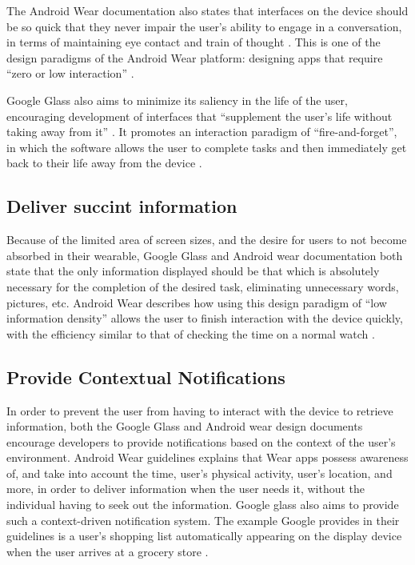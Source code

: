 \documentclass[12pt]{article}
\begin{document}
The Android Wear documentation also states that interfaces on the device should be so quick that they never impair the user's ability to engage in a conversation, in terms of maintaining eye contact and train of thought \cite{andr}. This is one of the design paradigms of the Android Wear platform: designing apps that require ``zero or low interaction'' \cite{andr2}.

Google Glass also aims to minimize its saliency in the life of the user, encouraging development of interfaces that ``supplement the user's life without taking away from it'' \cite{goog}. It promotes an interaction paradigm of ``fire-and-forget'', in which the software allows the user to complete tasks and then immediately get back to their life away from the device \cite{goog}.

\subsection{Deliver succint information}
Because of the limited area of screen sizes, and the desire for users to not become absorbed in their wearable, Google Glass and Android wear documentation both state that the only information displayed should be that which is absolutely necessary for the completion of the desired task, eliminating unnecessary words, pictures, etc. Android Wear describes how using this design paradigm of ``low information density'' allows the user to finish interaction with the device quickly, with the efficiency similar to that of checking the time on a normal watch \cite{andr3}. 

\subsection{Provide Contextual Notifications}
In order to prevent the user from having to interact with the device to retrieve information, both the Google Glass and Android wear design documents encourage developers to provide notifications based on the context of the user's environment. Android Wear guidelines explains that Wear apps possess awareness of, and take into account the time, user's physical activity, user's location, and more, in order to deliver information when the user needs it, without the individual having to seek out the information\cite{andr2}. Google glass also aims to provide such a context-driven notification system. The example Google provides in their guidelines is a user's shopping list automatically appearing on the display device when the user arrives at a grocery store \cite{goog}.
\end{document}
